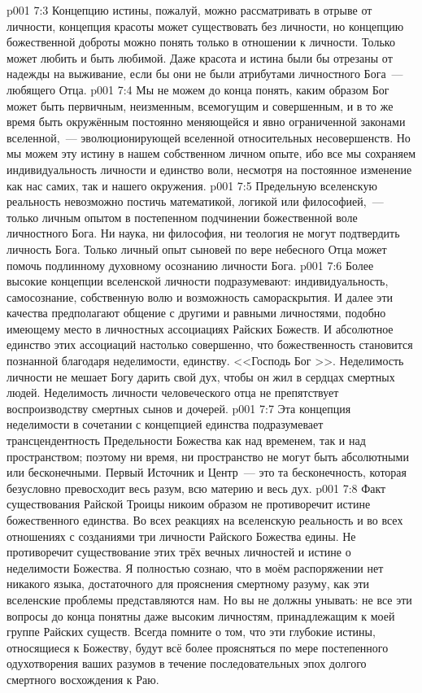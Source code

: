 \vs p001 7:3 \pc Концепцию истины, пожалуй, можно рассматривать в отрыве от личности, концепция красоты может существовать без личности, но концепцию божественной доброты можно понять только в отношении к личности. Только  может любить и быть любимой. Даже красота и истина были бы отрезаны от надежды на выживание, если бы они не были атрибутами личностного Бога~--- любящего Отца.
\vs p001 7:4 \pc Мы не можем до конца понять, каким образом Бог может быть первичным, неизменным, всемогущим и совершенным, и в то же время быть окружённым постоянно меняющейся и явно ограниченной законами вселенной,~--- эволюционирующей вселенной относительных несовершенств. Но мы можем  эту истину в нашем собственном личном опыте, ибо все мы сохраняем индивидуальность личности и единство воли, несмотря на постоянное изменение как нас самих, так и нашего окружения.
\vs p001 7:5 Предельную вселенскую реальность невозможно постичь математикой, логикой или философией,~--- только личным опытом в постепенном подчинении божественной воле личностного Бога. Ни наука, ни философия, ни теология не могут подтвердить личность Бога. Только личный опыт сыновей по вере небесного Отца может помочь подлинному духовному осознанию личности Бога.
\vs p001 7:6 \pc Более высокие концепции вселенской личности подразумевают: индивидуальность, самосознание, собственную волю и возможность самораскрытия. И далее эти качества предполагают общение с другими и равными личностями, подобно имеющему место в личностных ассоциациях Райских Божеств. И абсолютное единство этих ассоциаций настолько совершенно, что божественность становится познанной благодаря неделимости, единству. <<Господь Бог >>. Неделимость личности не мешает Богу дарить свой дух, чтобы он жил в сердцах смертных людей. Неделимость личности человеческого отца не препятствует воспроизводству смертных сынов и дочерей.
\vs p001 7:7 Эта концепция неделимости в сочетании с концепцией единства подразумевает трансцендентность Предельности Божества как над временем, так и над пространством; поэтому ни время, ни пространство не могут быть абсолютными или бесконечными. Первый Источник и Центр~--- это та бесконечность, которая безусловно превосходит весь разум, всю материю и весь дух.
\vs p001 7:8 Факт существования Райской Троицы никоим образом не противоречит истине божественного единства. Во всех реакциях на вселенскую реальность и во всех отношениях с созданиями три личности Райского Божества едины. Не противоречит существование этих трёх вечных личностей и истине о неделимости Божества. Я полностью сознаю, что в моём распоряжении нет никакого языка, достаточного для прояснения смертному разуму, как эти вселенские проблемы представляются нам. Но вы не должны унывать: не все эти вопросы до конца понятны даже высоким личностям, принадлежащим к моей группе Райских существ. Всегда помните о том, что эти глубокие истины, относящиеся к Божеству, будут всё более проясняться по мере постепенного одухотворения ваших разумов в течение последовательных эпох долгого смертного восхождения к Раю.
